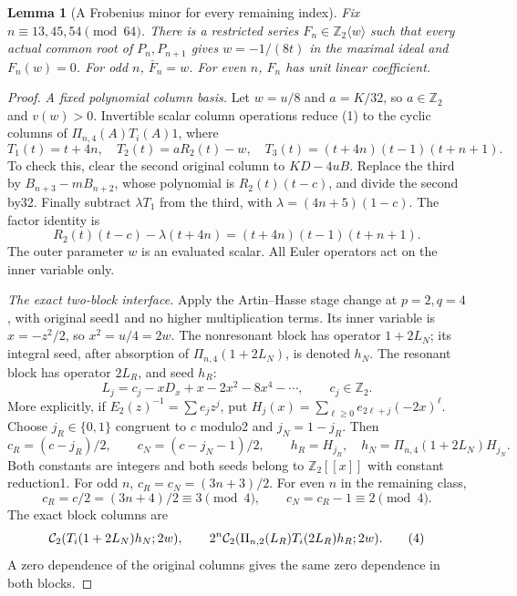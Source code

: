 \documentclass[11pt]{article}
\newtheorem{lemma}{Lemma}
\begin{document}
\begin{lemma}[A Frobenius minor for every remaining index]
\label{lem:frobenius-minor}
Fix $n\equiv13,45,54\pmod{64}$.
There is a restricted series $F_n\in\mathbb Z_2\langle w\rangle$
such that every actual common root of $P_n,P_{n+1}$ gives
$w=-1/(8t)$ in the maximal ideal and $F_n(w)=0$.
For odd $n$, $\bar F_n=w$.
For even $n$, $F_n$ has unit linear coefficient.
\end{lemma}
\begin{proof}
\par\medskip\noindent\textit{A fixed polynomial column basis.}
Let $w=u/8$ and $a=K/32$, so $a\in\mathbb Z_2$ and $v(w)>0$.
Invertible scalar column operations reduce (1) to the cyclic
columns of $\Pi_{n,4}(A)T_i(A)1$, where
\[
 T_1(t)=t+4n,\quad T_2(t)=aR_2(t)-w,\quad
 T_3(t)=(t+4n)(t-1)(t+n+1).                         \tag{2}
\]
To check this, clear the second original column to $KD-4uB$.
Replace the third by $B_{n+3}-mB_{n+2}$, whose polynomial is
$R_2(t)(t-c)$, and divide the second by32.
Finally subtract $\lambda T_1$ from the third, with
$\lambda=(4n+5)(1-c)$.
The factor identity is
\[
 R_2(t)(t-c)-\lambda(t+4n)
             =(t+4n)(t-1)(t+n+1).
\]
The outer parameter $w$ is an evaluated scalar.
All Euler operators act on the inner variable only.

\par\medskip\noindent\textit{The exact two-block interface.}
Apply the Artin--Hasse stage change at $p=2,q=4$, with original
seed1 and no higher multiplication terms.
Its inner variable is $x=-z^2/2$, so $x^2=u/4=2w$.
The nonresonant block has operator $1+2L_N$; its integral seed,
after absorption of $\Pi_{n,4}(1+2L_N)$, is denoted $h_N$.
The resonant block has operator $2L_R$, and seed $h_R$:
\[
 L_j=c_j-xD_x+x-2x^2-8x^4-\cdots,\qquad c_j\in\mathbb Z_2.
\]
More explicitly, if $E_2(z)^{-1}=\sum e_jz^j$, put
$H_j(x)=\sum_{\ell\ge0}e_{2\ell+j}(-2x)^\ell$.
Choose $j_R\in\{0,1\}$ congruent to $c$ modulo2 and $j_N=1-j_R$.
Then
\[
 c_R=(c-j_R)/2,\qquad c_N=(c-j_N-1)/2,\qquad
 h_R=H_{j_R},\quad
 h_N=\Pi_{n,4}(1+2L_N)H_{j_N}.
\]
Both constants are integers and both seeds belong to
$\mathbb Z_2[[x]]$ with constant reduction1.
For odd $n$, $c_R=c_N=(3n+3)/2$.
For even $n$ in the remaining class,
\[
 c_R=c/2=(3n+4)/2\equiv3\pmod4,\qquad c_N=c_R-1\equiv2\pmod4.
                                                               \tag{3}
\]
The exact block columns are
\[
 {\cal C}_2(T_i(1+2L_N)h_N;2w),\qquad
 2^n{\cal C}_2(\Pi_{n,2}(L_R)T_i(2L_R)h_R;2w).       \tag{4}
\]
A zero dependence of the original columns gives the same zero
dependence in both blocks.


\end{proof}
\end{document}
